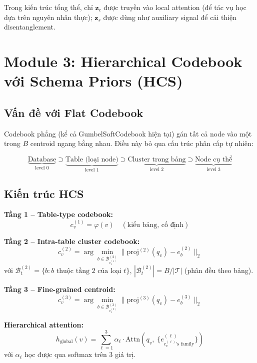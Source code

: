 \documentclass[12pt,a4paper]{article}
\begin{document}
Trong kiến trúc tổng thể, chỉ $\mathbf{z}_c$ được truyền vào local attention
(để tác vụ học dựa trên nguyên nhân thực); $\mathbf{z}_s$ được dùng như
auxiliary signal để cải thiện disentanglement.

\section{Module 3: Hierarchical Codebook với Schema Priors (HCS)}

\subsection{Vấn đề với Flat Codebook}

Codebook phẳng (kể cả GumbelSoftCodebook hiện tại) gán tất cả node vào một
trong $B$ centroid ngang bằng nhau. Điều này bỏ qua cấu trúc phân cấp tự nhiên:

\[
  \underbrace{\text{Database}}_{\text{level 0}}
  \supset \underbrace{\text{Table (loại node)}}_{\text{level 1}}
  \supset \underbrace{\text{Cluster trong bảng}}_{\text{level 2}}
  \supset \underbrace{\text{Node cụ thể}}_{\text{level 3}}
\]

\subsection{Kiến trúc HCS}

\begin{mathbox}[title={Hierarchical Codebook -- ba tầng}]
\textbf{Tầng 1 -- Table-type codebook:}
\begin{equation}
  c^{(1)}_{v} = \varphi(v) \quad (\text{kiểu bảng, cố định})
\end{equation}

\textbf{Tầng 2 -- Intra-table cluster codebook:}
\begin{equation}
  c^{(2)}_{v} = \arg\min_{b \in \mathcal{B}^{(2)}_{c^{(1)}_v}}
    \bigl\| \text{proj}^{(2)}(q_v) - e^{(2)}_b \bigr\|_2
  \label{eq:hcs2}
\end{equation}
với $\mathcal{B}^{(2)}_t = \{b : b \text{ thuộc tầng 2 của loại } t\}$,
$|\mathcal{B}^{(2)}_t| = B/|\mathcal{T}|$ (phân đều theo bảng).

\textbf{Tầng 3 -- Fine-grained centroid:}
\begin{equation}
  c^{(3)}_{v} = \arg\min_{b \in \mathcal{B}^{(3)}_{c^{(2)}_v}}
    \bigl\| \text{proj}^{(3)}(q_v) - e^{(3)}_b \bigr\|_2
  \label{eq:hcs3}
\end{equation}

\textbf{Hierarchical attention:}
\begin{equation}
  h_\text{global}(v) = \sum_{\ell=1}^{3} \alpha_\ell \cdot
    \text{Attn}\!\left(q_v,\; \{e^{(\ell)}_{c^{(\ell)}_v \text{'s family}}\}\right)
  \label{eq:hcs_attn}
\end{equation}
với $\alpha_\ell$ học được qua softmax trên 3 giá trị.
\end{mathbox}
\end{document}
